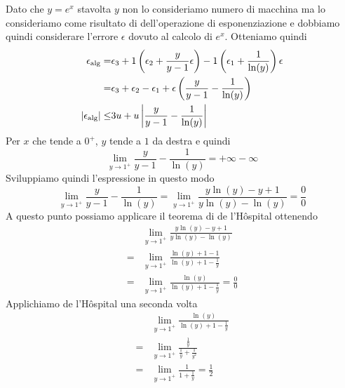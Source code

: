 \begin{example}
\begin{center}
	\end{center}
	Dato che $y=e^x$ stavolta $y$ non lo consideriamo numero di macchina ma lo consideriamo come risultato di
	dell'operazione di esponenziazione e dobbiamo quindi considerare l'errore $\epsilon$ dovuto al calcolo di
	$e^x$. Otteniamo quindi
	\begin{align*}
		\epsilon_\text{alg} =      & \epsilon_3 + 1 \left( \epsilon_2 + \frac{y}{y-1} \epsilon \right) -
		1 \left( \epsilon_1 + \frac{1}{\ln (y)} \right) \epsilon                           \\
		=            & \epsilon_3 + \epsilon_2 - \epsilon_1 +
		\epsilon \left( \frac{y}{y-1} - \frac{1}{\ln (y)} \right)                          \\
		|\epsilon_\text{alg}| \leq & 3u + u \left| \frac{y}{y-1} - \frac{1}{\ln(y)} \right|              \\
	\end{align*}
	Per $x$ che tende a $0^+$, $y$ tende a $1$ da destra e quindi
	\[ \lim_{y \to 1^+} \frac{y}{y-1} - \frac{1}{\ln (y)} = +\infty - \infty \]
	Sviluppiamo quindi l'espressione in questo modo
	\[
		\lim_{y \to 1^+} \frac{y}{y-1} - \frac{1}{\ln(y)} =
		\lim_{y \to 1^+} \frac{y \ln (y) - y + 1}{y \ln(y) - \ln (y)} = \frac{0}{0}
	\]
	A questo punto possiamo applicare il teorema di de l'H\^ospital ottenendo
	\begin{align*}
		  & \lim_{y \to 1^+} \frac{y \ln (y) - y + 1}{y \ln(y) - \ln (y)}            \\
		= & \lim_{y \to 1^+} \frac{\ln (y) + 1 - 1}{\ln (y) + 1 - \frac{1}{y}}       \\
		= & \lim_{y \to 1^+} \frac{\ln (y)}{\ln (y) + 1 - \frac{1}{y}} = \frac{0}{0}
	\end{align*}
	Applichiamo de l'H\^ospital una seconda volta
	\begin{align*}
		  & \lim_{y \to 1^+} \frac{\ln (y)}{\ln (y) + 1 - \frac{1}{y}}       \\
		= & \lim_{y \to 1^+} \frac{\frac{1}{y}}{\frac{1}{y} + \frac{1}{y^2}} \\
		= & \lim_{y \to 1^+} \frac{1}{1 + \frac{1}{y}} = \frac{1}{2}
	\end{align*}

\end{example}
